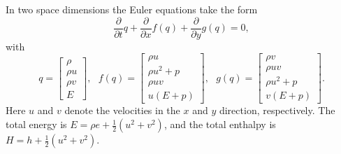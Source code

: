 \documentclass{article}
\begin{document}
In two space dimensions the Euler equations take the form
\begin{equation}
	\frac{\partial}{\partial t} q + \frac{\partial}{\partial x} f(q) + \frac{\partial}{\partial y} g(q) = 0,
	\label{eqn:euler2D}
\end{equation}
with 
\begin{equation}
	q = \left[ \begin{array}{c} \rho \\ \rho u \\ \rho v \\ E \end{array} \right  ], ~~~ 
	f(q) = \left[ \begin{array}{c} \rho u \\ \rho u^2 + p \\ \rho uv \\ u(E+p) \end{array} \right],~~~
	g(q) =  \left[ \begin{array}{c} \rho v \\ \rho uv \\ \rho u^2 + p \\ v(E+p) \end{array} \right].
\end{equation}
Here $u$ and $v$ denote the velocities in the $x$ and $y$ direction, respectively.  The total energy is $E 
= \rho e + \frac{1}{2}(u^2 + v^2)$, and the total enthalpy is $H = h + \frac{1}{2}(u^2 + v^2)$.
\end{document}

